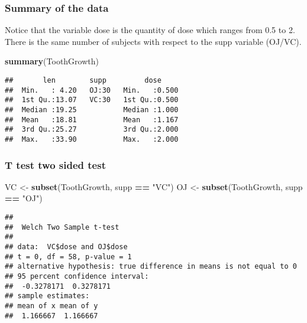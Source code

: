 \documentclass[]{article}
\newenvironment{Shaded}{\begin{snugshade}}{\end{snugshade}}
\newcommand{\KeywordTok}[1]{\textcolor[rgb]{0.13,0.29,0.53}{\textbf{#1}}}
\newcommand{\DataTypeTok}[1]{\textcolor[rgb]{0.13,0.29,0.53}{#1}}
\newcommand{\StringTok}[1]{\textcolor[rgb]{0.31,0.60,0.02}{#1}}
\newcommand{\OtherTok}[1]{\textcolor[rgb]{0.56,0.35,0.01}{#1}}
\newcommand{\OperatorTok}[1]{\textcolor[rgb]{0.81,0.36,0.00}{\textbf{#1}}}
\newcommand{\NormalTok}[1]{#1}
\begin{document}
\subsubsection{Summary of the data}\label{summary-of-the-data}

Notice that the variable dose is the quantity of dose which ranges from
0.5 to 2. There is the same number of subjects with respect to the supp
variable (OJ/VC).

\begin{Shaded}
\begin{Highlighting}[]
\KeywordTok{summary}\NormalTok{(ToothGrowth)}
\end{Highlighting}
\end{Shaded}

\begin{verbatim}
##       len        supp         dose      
##  Min.   : 4.20   OJ:30   Min.   :0.500  
##  1st Qu.:13.07   VC:30   1st Qu.:0.500  
##  Median :19.25           Median :1.000  
##  Mean   :18.81           Mean   :1.167  
##  3rd Qu.:25.27           3rd Qu.:2.000  
##  Max.   :33.90           Max.   :2.000
\end{verbatim}

\subsubsection{T test two sided test}\label{t-test-two-sided-test}

\begin{Shaded}
\begin{Highlighting}[]
\NormalTok{VC <-}\StringTok{ }\KeywordTok{subset}\NormalTok{(ToothGrowth, supp }\OperatorTok{==}\StringTok{ "VC"}\NormalTok{)}
\NormalTok{OJ <-}\StringTok{ }\KeywordTok{subset}\NormalTok{(ToothGrowth, supp }\OperatorTok{==}\StringTok{ "OJ"}\NormalTok{)}
\end{Highlighting}
\end{Shaded}

\begin{Shaded}
\end{Shaded}

\begin{verbatim}
## 
##  Welch Two Sample t-test
## 
## data:  VC$dose and OJ$dose
## t = 0, df = 58, p-value = 1
## alternative hypothesis: true difference in means is not equal to 0
## 95 percent confidence interval:
##  -0.3278171  0.3278171
## sample estimates:
## mean of x mean of y 
##  1.166667  1.166667
\end{verbatim}
\end{document}
